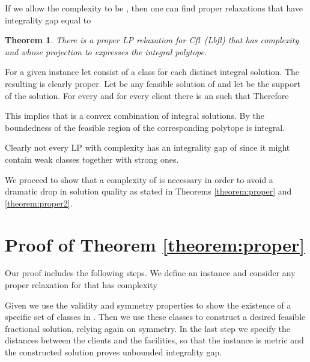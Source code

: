 \documentclass[11pt]{article}\usepackage{amsmath}
\newtheorem{theorem}{Theorem}[section]
\newcommand{\lbfl}{{\sc Lbfl}}
\newcommand{\cfl}{{\sc Cfl}}
\begin{document}
\iffalse   ---- contained in the main body of the paper 
\begin{theorem}  \label{thm:gap1}
There is a proper LP relaxation for \cfl\ (\lbfl\/)  whose projection to  expresses the
integral polytope. 
\end{theorem}
\fi 
\medskip


If we allow the complexity to be , then one can find
proper relaxations that have integrality gap equal to  



\begin{theorem}  \label{thm:gap1}
There is a proper LP relaxation for \cfl\ (\lbfl\/)  that has complexity  
and whose projection to  expresses the
integral polytope. 
\end{theorem}

{}
For a given instance let  consist of a class for each
distinct integral solution. The resulting  is clearly
proper. Let  be any feasible solution of  and let
 be the support of  the solution. For every  and 
for every client  there is an  such that  Therefore 

This implies that  is a convex combination of integral
solutions. By the boundedness of the feasible region of
 the  corresponding polytope is integral.  
\mbox{} \hfill \mathqed  

Clearly not every LP with complexity  has an integrality gap of 
since it might contain weak classes together with  strong
ones.


We proceed  to show that a complexity of   is necessary 
in order to avoid a dramatic drop in solution quality as stated in 
Theorems \ref{theorem:proper} and \ref{theorem:proper2}.







\section{Proof of Theorem \ref{theorem:proper}}
\label{sec:proof_theorem_p1}

Our proof includes the following steps. We define an instance  
and consider any proper relaxation  for  that has complexity
 
Given  we use   the validity  and symmetry properties to show the existence of
a specific set of classes in . Then we use these classes to construct a
desired feasible fractional solution, relying again on symmetry. 
In the last step  we specify  the distances between the clients and  the facilities, so
that the instance is metric and the constructed solution proves unbounded integrality
gap.
\end{document}
